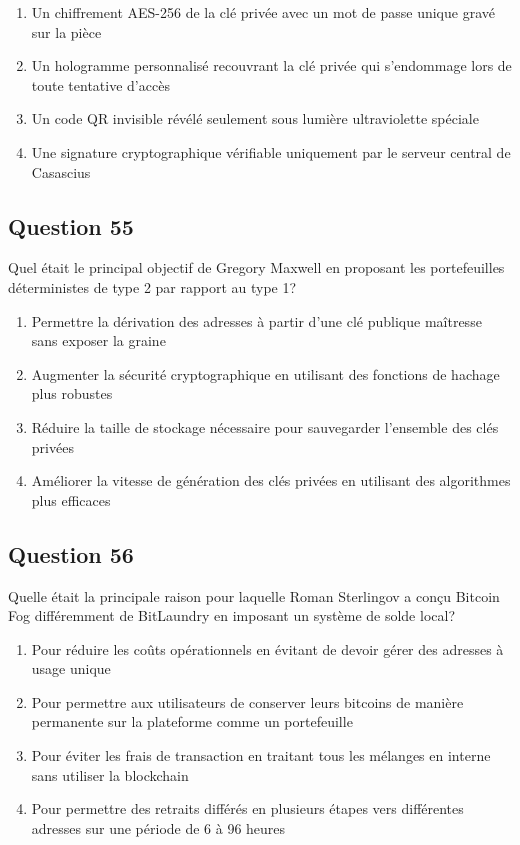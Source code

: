 \documentclass[12pt,a4paper]{article}
\begin{document}
\begin{enumerate}[label=\Alph*., leftmargin=*]
\item Un chiffrement AES-256 de la clé privée avec un mot de passe unique gravé sur la pièce
\item Un hologramme personnalisé recouvrant la clé privée qui s'endommage lors de toute tentative d'accès
\item Un code QR invisible révélé seulement sous lumière ultraviolette spéciale
\item Une signature cryptographique vérifiable uniquement par le serveur central de Casascius
\end{enumerate}

\bigskip


\subsection*{Question 55}
Quel était le principal objectif de Gregory Maxwell en proposant les portefeuilles déterministes de type 2 par rapport au type 1?

\begin{enumerate}[label=\Alph*., leftmargin=*]
\item Permettre la dérivation des adresses à partir d'une clé publique maîtresse sans exposer la graine
\item Augmenter la sécurité cryptographique en utilisant des fonctions de hachage plus robustes
\item Réduire la taille de stockage nécessaire pour sauvegarder l'ensemble des clés privées
\item Améliorer la vitesse de génération des clés privées en utilisant des algorithmes plus efficaces
\end{enumerate}

\bigskip


\subsection*{Question 56}
Quelle était la principale raison pour laquelle Roman Sterlingov a conçu Bitcoin Fog différemment de BitLaundry en imposant un système de solde local?

\begin{enumerate}[label=\Alph*., leftmargin=*]
\item Pour réduire les coûts opérationnels en évitant de devoir gérer des adresses à usage unique
\item Pour permettre aux utilisateurs de conserver leurs bitcoins de manière permanente sur la plateforme comme un portefeuille
\item Pour éviter les frais de transaction en traitant tous les mélanges en interne sans utiliser la blockchain
\item Pour permettre des retraits différés en plusieurs étapes vers différentes adresses sur une période de 6 à 96 heures
\end{enumerate}
\end{document}
